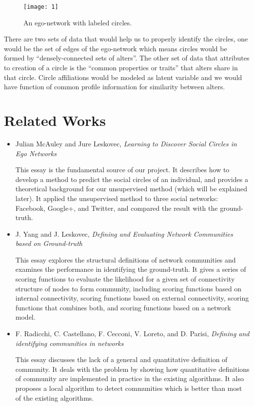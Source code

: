 \documentclass[12pt,a4paper]{article}
\begin{document}
\begin{figure}[H]
\centering
\texttt{[image: 1]}
\caption{An ego-network with labeled circles.}
\label{fig1}
\end{figure}

\par \noindent There are two sets of data that would help us to properly identify the circles, one would be the set of edges of the ego-network which means circles would be formed by ``densely-connected sets of alters''. The other set of data that attributes to creation of a circle is the ``common properties or traits'' that alters share in that circle. Circle affiliations would be modeled as latent variable and we would have function of common profile information for similarity between alters.

\section*{Related Works}
\begin{itemize}
    \item Julian McAuley and Jure Leskovec, \textit{Learning to Discover Social Circles in Ego Networks}
    \par
    This essay is the fundamental source of our project. It describes how to develop a method to predict the social circles of an individual, and provides a theoretical background for our unsupervised method (which will be explained later). It applied the unsupervised method to three social networks: Facebook, Google+, and Twitter, and compared the result with the ground-truth.
    \item J. Yang and J. Leskovec, \textit{Defining and Evaluating Network Communities based on Ground-truth}
    \par
    This essay explores the structural definitions of network communities and examines the performance in identifying the ground-truth. It gives a series of scoring functions to evaluate the likelihood for a given set of connectivity structure of nodes to form community, including scoring functions based on internal connectivity, scoring functions based on external connectivity, scoring functions that combines both, and scoring functions based on a network model.
    \item F. Radicchi, C. Castellano, F. Cecconi, V. Loreto, and D. Parisi, \textit{Defining and identifying communities in networks}
    \par 
    This essay discusses the lack of a general and quantitative definition of community. It deals with the problem by showing how quantitative definitions of community are implemented in practice in the existing algorithms. It also proposes a local algorithm to detect communities which is better than most of the existing algorithms.

\end{itemize}
\end{document}
